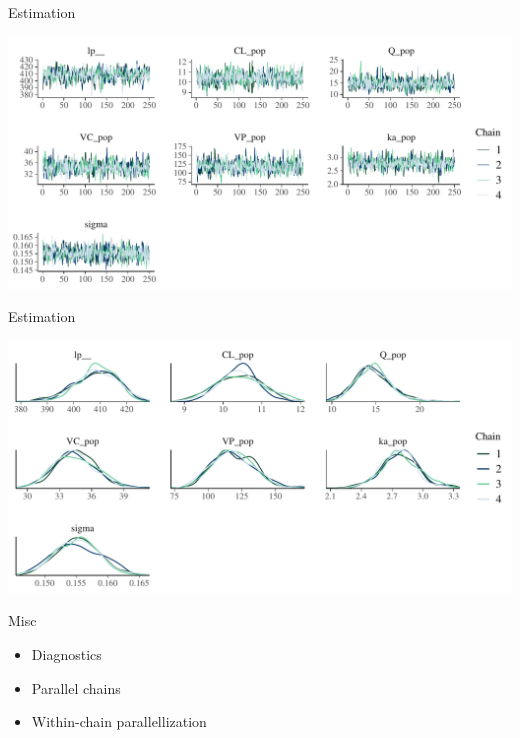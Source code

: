 \documentclass[bigger]{beamer}
\begin{document}
\begin{frame}[label={sec:orgc79e445}]{Estimation}
\begin{center}
\includegraphics[width=\textwidth]{./figure/pop_trace.pdf}
\end{center}
\end{frame}

\begin{frame}[label={sec:orgd4661f4}]{Estimation}
\begin{center}
\includegraphics[width=\textwidth]{./figure/pop_dens.pdf}
\end{center}
\end{frame}


\begin{frame}[label={sec:orgfebfa9c}]{Misc}
\begin{itemize}
\item Diagnostics
\item Parallel chains
\item Within-chain parallellization
\end{itemize}
\end{frame}
\end{document}
